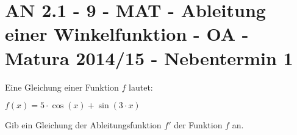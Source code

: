 \section{AN 2.1 - 9 - MAT - Ableitung einer Winkelfunktion - OA - Matura 2014/15 - Nebentermin 1}

\begin{beispiel}[AN 2.1]{1} %
Eine Gleichung einer Funktion $f$ lautet:

$f(x)=5\cdot \cos(x)+\sin(3\cdot x)$ \leer

Gib ein Gleichung der Ableitungsfunktion $f'$ der Funktion $f$ an.

\end{beispiel}